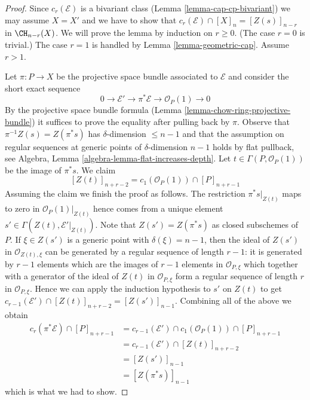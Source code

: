 \begin{proof}
Since $c_r(\mathcal{E})$ is a bivariant class
(Lemma \ref{lemma-cap-cp-bivariant})
we may assume $X = X'$ and we have to show that
$c_r(\mathcal{E}) \cap [X]_n = [Z(s)]_{n - r}$ in $\CH_{n - r}(X)$.
We will prove the lemma by induction on $r \geq 0$. (The case
$r = 0$ is trivial.) The case $r = 1$
is handled by Lemma \ref{lemma-geometric-cap}. Assume $r > 1$.

\medskip\noindent
Let $\pi : P \to X$ be the projective space bundle associated to
$\mathcal{E}$ and consider the short exact sequence
$$
0 \to \mathcal{E}' \to \pi^*\mathcal{E} \to \mathcal{O}_P(1) \to 0
$$
By the projective space bundle formula
(Lemma \ref{lemma-chow-ring-projective-bundle})
it suffices to prove the equality after pulling back by $\pi$.
Observe that $\pi^{-1}Z(s) = Z(\pi^*s)$ has $\delta$-dimension
$\leq n - 1$ and that the assumption on regular sequences at
generic points of $\delta$-dimension $n - 1$ holds by
flat pullback, see
Algebra, Lemma \ref{algebra-lemma-flat-increases-depth}.
Let $t \in \Gamma(P, \mathcal{O}_P(1))$ be the image of $\pi^*s$.
We claim
$$
[Z(t)]_{n + r - 2} = c_1(\mathcal{O}_P(1)) \cap [P]_{n + r - 1}
$$
Assuming the claim we finish the proof as follows.
The restriction $\pi^*s|_{Z(t)}$ maps to zero in
$\mathcal{O}_P(1)|_{Z(t)}$ hence comes from a unique
element $s' \in \Gamma(Z(t), \mathcal{E}'|_{Z(t)})$.
Note that $Z(s') = Z(\pi^*s)$ as closed subschemes of $P$.
If $\xi \in Z(s')$ is a generic point with $\delta(\xi) = n - 1$,
then the ideal of $Z(s')$ in $\mathcal{O}_{Z(t), \xi}$
can be generated by a regular sequence of length $r - 1$: it is generated by
$r - 1$ elements which are the images of $r - 1$ elements in
$\mathcal{O}_{P, \xi}$ which together with a generator of the
ideal of $Z(t)$ in $\mathcal{O}_{P, \xi}$ form a regular sequence
of length $r$ in $\mathcal{O}_{P, \xi}$. Hence we can apply the
induction hypothesis to $s'$ on $Z(t)$ to get
$c_{r - 1}(\mathcal{E}') \cap [Z(t)]_{n + r - 2} = [Z(s')]_{n - 1}$.
Combining all of the above we obtain
\begin{align*}
c_r(\pi^*\mathcal{E}) \cap [P]_{n + r - 1}
& =
c_{r - 1}(\mathcal{E}') \cap c_1(\mathcal{O}_P(1)) \cap [P]_{n + r - 1} \\
& =
c_{r - 1}(\mathcal{E}') \cap [Z(t)]_{n + r - 2} \\
& =
[Z(s')]_{n - 1} \\
& = [Z(\pi^*s)]_{n - 1}
\end{align*}
which is what we had to show.


\end{proof}
